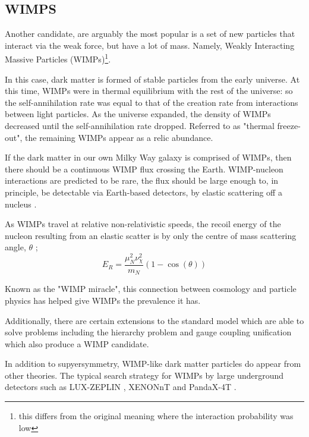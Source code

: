 \subsection{WIMPS}
\label{sec:wimp_as_a_candidate}
\par
Another candidate, are arguably the most popular is a set of new particles that interact via the weak force, but have a lot of mass.
Namely, Weakly Interacting Massive Particles (WIMPs)\footnote{this differs from the original meaning where the interaction probability was low}. 
\par
In this case, dark matter is formed of stable particles from the early universe.
At this time, WIMPs were in thermal equilibrium with the rest of the universe: so the self-annihilation rate was equal to that of the creation rate from interactions between light particles.
As the universe expanded, the density of WIMPs decreased until the self-annihilation rate dropped.
Referred to as "thermal freeze-out", the remaining WIMPs appear as a relic abundance. 

If the dark matter in our own Milky Way galaxy is comprised of WIMPs, then there should be a continuous WIMP flux crossing the Earth.
WIMP-nucleon interactions are predicted to be rare, the flux should be large enough to, in principle, be detectable via Earth-based detectors, by elastic scattering off a nucleus \cite{wimp_nucleon_interactions_first_suggestion_ref,supersymmetric_dark_matter_ref}.

As WIMPs travel at relative non-relativistic speeds, the recoil energy of the nucleon resulting from an elastic scatter is by only the centre of mass scattering angle, $\theta$ \cite{direct_detection_of_wimps_ref};
\begin{equation}
    E_{R} = \frac{{\mu}_{N}^{2}\nu_{\chi}^2}{m_{N}}(1-\cos(\theta))
\end{equation}


\par
Known as the "WIMP miracle", this connection between cosmology and particle physics has helped give WIMPs the prevalence it has.


\par
Additionally, there are certain extensions to the standard model which are able to solve problems including the hierarchy problem and gauge coupling unification which also produce a WIMP candidate.


\par
In addition to supyersymmetry, WIMP-like dark matter particles do appear from other theories.
The typical search strategy for WIMPs by large underground detectors such as LUX-ZEPLIN \cite{LZ_TechnicalDesignReview_ref}, XENONnT \cite{xenonnt_projected_sensitivty_ref} and PandaX-4T \cite{pandax_4t_ref}.